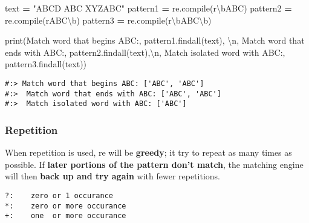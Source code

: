 \documentclass[
]{book}
\newenvironment{Shaded}{\begin{snugshade}}{\end{snugshade}}
\newcommand{\BuiltInTok}[1]{#1}
\newcommand{\CharTok}[1]{\textcolor[rgb]{0.5,0.5,0.5}{#1}}
\newcommand{\NormalTok}[1]{#1}
\newcommand{\OperatorTok}[1]{\textcolor[rgb]{0.43,0.43,0.43}{\textbf{#1}}}
\newcommand{\StringTok}[1]{\textcolor[rgb]{0.5,0.5,0.5}{#1}}
\newcommand{\VerbatimStringTok}[1]{\textcolor[rgb]{0.5,0.5,0.5}{#1}}
\begin{document}
\begin{Shaded}
\begin{Highlighting}[]
\NormalTok{text }\OperatorTok{=} \StringTok{"ABCD ABC XYZABC"}
\NormalTok{pattern1 }\OperatorTok{=}\NormalTok{ re.}\BuiltInTok{compile}\NormalTok{(}\VerbatimStringTok{r\textquotesingle{}\textbackslash{}bABC\textquotesingle{}}\NormalTok{)}
\NormalTok{pattern2 }\OperatorTok{=}\NormalTok{ re.}\BuiltInTok{compile}\NormalTok{(}\VerbatimStringTok{r\textquotesingle{}ABC\textbackslash{}b\textquotesingle{}}\NormalTok{)}
\NormalTok{pattern3 }\OperatorTok{=}\NormalTok{ re.}\BuiltInTok{compile}\NormalTok{(}\VerbatimStringTok{r\textquotesingle{}\textbackslash{}bABC\textbackslash{}b\textquotesingle{}}\NormalTok{)}

\BuiltInTok{print}\NormalTok{(}\StringTok{\textquotesingle{}Match word that begins ABC:\textquotesingle{}}\NormalTok{,}
\NormalTok{  pattern1.findall(text), }\StringTok{\textquotesingle{}}\CharTok{\textbackslash{}n}\StringTok{\textquotesingle{}}\NormalTok{,}
  \StringTok{\textquotesingle{}Match word that ends with ABC:\textquotesingle{}}\NormalTok{,}
\NormalTok{  pattern2.findall(text),}\StringTok{\textquotesingle{}}\CharTok{\textbackslash{}n}\StringTok{\textquotesingle{}}\NormalTok{,}
  \StringTok{\textquotesingle{}Match isolated word with ABC:\textquotesingle{}}\NormalTok{,}
\NormalTok{  pattern3.findall(text))}
\end{Highlighting}
\end{Shaded}

\begin{verbatim}
#:> Match word that begins ABC: ['ABC', 'ABC'] 
#:>  Match word that ends with ABC: ['ABC', 'ABC'] 
#:>  Match isolated word with ABC: ['ABC']
\end{verbatim}

\hypertarget{repetition}{%
\subsubsection{Repetition}\label{repetition}}

When repetition is used, re will be \textbf{greedy}; it try to repeat as many times as possible. If \textbf{later portions of the pattern don't match}, the matching engine will then \textbf{back up and try again} with fewer repetitions.

\begin{verbatim}
?:    zero or 1 occurance
*:    zero or more occurance
+:    one  or more occurance
\end{verbatim}
\end{document}
